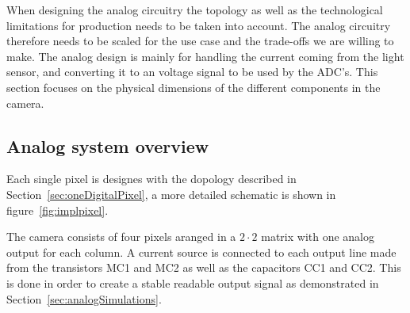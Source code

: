 
When designing the analog circuitry the topology as well as the technological limitations for production needs to be taken into account. The analog circuitry therefore needs to be scaled for the use case and the trade-offs we are willing to make.
The analog design is mainly for handling the current coming from the light sensor, and converting it to an voltage signal to be used by the ADC's.
This section focuses on the physical dimensions of the different components in the camera.

\subsection{Analog system overview}

Each single pixel is designes with the dopology described in Section~\ref{sec:oneDigitalPixel}, a more detailed schematic is shown in figure~\ref{fig:implpixel}.

The camera consists of four pixels aranged in a $2 \cdot 2 $ matrix with one analog output for each column.
A current source is connected to each output line made from the transistors MC1 and MC2 as well as the capacitors CC1 and CC2.
This is done in order to create a stable readable output signal as demonstrated in Section~\ref{sec:analogSimulations}.

